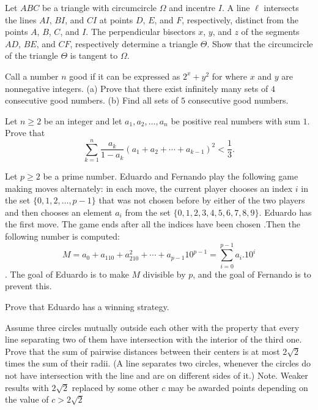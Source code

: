 \documentclass[11pt]{scrartcl}
\begin{document}
\begin{problem}[719467452801051]
Let $ABC$ be a triangle with circumcircle $\Omega$ and incentre $I$. A line $\ell$ intersects the lines $AI$, $BI$, and $CI$ at points $D$, $E$, and $F$, respectively, distinct from the points $A$, $B$, $C$, and $I$. The perpendicular bisectors $x$, $y$, and $z$ of the segments $AD$, $BE$, and $CF$, respectively determine a triangle $\Theta$. Show that the circumcircle of the triangle $\Theta$ is tangent to $\Omega$.
\end{problem}
\begin{problem}[723162974888793]
	Call a number $n$ good if it can be expressed as $2^x+y^2$ for where $x$ and $y$ are nonnegative integers.
(a) Prove that there exist infinitely many sets of $4$ consecutive good numbers.
(b) Find all sets of $5$ consecutive good numbers.
\end{problem}
\begin{problem}[723258861624579]
Let $n\geq 2$ be an integer and let $a_1, a_2, \ldots, a_n$ be positive real numbers with sum $1$. Prove that$$\sum_{k=1}^n \frac{a_k}{1-a_k}(a_1+a_2+\cdots+a_{k-1})^2 < \frac{1}{3}.$$
\end{problem}
\begin{problem}[723726912323207]
Let $ p \geq 2$ be a prime number. Eduardo and Fernando play the following game making moves alternately: in each move, the current player chooses an index $i$ in the set $\{0,1,2,\ldots, p-1 \}$ that was not chosen before by either of the two players and then chooses an element $a_i$ from the set $\{0,1,2,3,4,5,6,7,8,9\}$. Eduardo has the first move. The game ends after all the indices have been chosen .Then the following number is computed:
$$M=a_0+a_110+a_210^2+\cdots+a_{p-1}10^{p-1}= \sum_{i=0}^{p-1}a_i.10^i$$.
The goal of Eduardo is to make $M$ divisible by $p$, and the goal of Fernando is to prevent this.

Prove that Eduardo has a winning strategy.
\end{problem}
\begin{problem}[725882523060129]
Assume three circles mutually outside each other with the property that every line separating two of them have intersection with the interior of the third one. Prove that the sum of pairwise distances between their centers is at most $2\sqrt{2}$ times the sum of their radii.
(A line separates two circles, whenever the circles do not have intersection with the line and are on different sides of it.)
Note. Weaker results with $2\sqrt{2}$ replaced by some other $c$ may be awarded points depending on the value of $c>2\sqrt{2}$
\end{problem}
\end{document}
